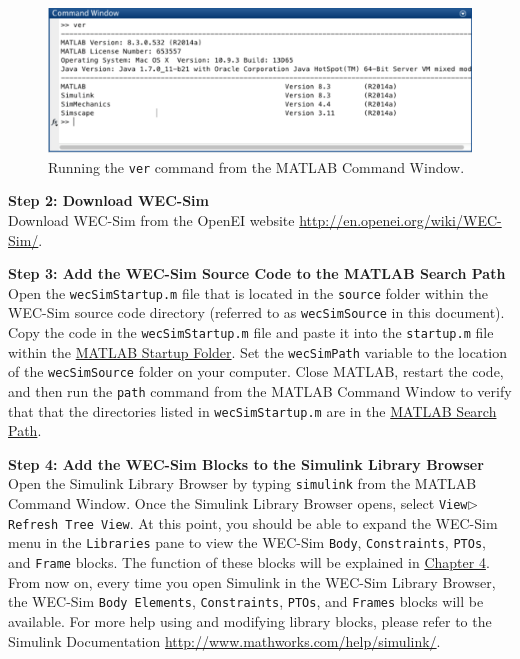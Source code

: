 \begin{figure}[H]
\noindent \begin{centering}
\includegraphics[scale=0.4]{gettingStarted/Figures/installMATLAB}
\protect\caption {Running the \texttt{ver} command from the MATLAB Command Window.}
\par\end{centering}
\end{figure}

\textbf{Step 2: Download WEC-Sim}\\
Download WEC-Sim from the OpenEI website \href{http://en.openei.org/wiki/WEC-Sim/}{http://en.openei.org/wiki/WEC-Sim/}.

\textbf{Step 3: Add the WEC-Sim Source Code to the MATLAB Search Path}\\
Open the \texttt{wecSimStartup.m} file that is located in the \texttt{source} folder within the WEC-Sim source code directory (referred to as \texttt{wecSimSource} in this document). Copy the code in the \texttt{wecSimStartup.m} file and paste it into the \texttt{startup.m} file within the \href{http://www.mathworks.com/help/matlab/matlab_env/matlab-startup-folder.html}{MATLAB Startup Folder}. Set the \texttt{wecSimPath} variable to the location of the \texttt{wecSimSource} folder on your computer. Close MATLAB, restart the code, and then run the \texttt{path} command from the MATLAB Command Window to verify that that the directories listed in \texttt{wecSimStartup.m} are in the \href{http://www.mathworks.com/help/matlab/search-path.html}{MATLAB Search Path}.

\textbf{Step 4: Add the WEC-Sim Blocks to the Simulink Library Browser}\\
Open the Simulink Library Browser by typing \texttt{simulink} from the MATLAB Command Window. Once the Simulink Library Browser opens, select \texttt{View}$\rhd$\texttt{Refresh Tree View}. At this point, you should be able to expand the WEC-Sim menu in the \texttt{Libraries} pane to view the WEC-Sim \texttt{Body}, \texttt{Constraints}, \texttt{PTOs}, and \texttt{Frame} blocks. The function of these blocks will be explained in \hyperlink{chapter.4}{Chapter 4}. From now on, every time you open Simulink in the WEC-Sim Library Browser, the WEC-Sim \texttt{Body Elements}, \texttt{Constraints}, \texttt{PTOs}, and \texttt{Frames} blocks will be available. For more help using and modifying library blocks, please refer to the Simulink Documentation \href{http://www.mathworks.com/help/simulink/}{http://www.mathworks.com/help/simulink/}.

